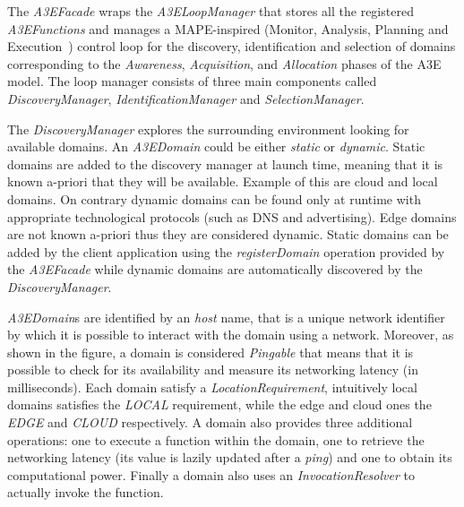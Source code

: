 The \textit{A3EFacade} wraps the \textit{A3ELoopManager} that stores all the registered \textit{A3EFunctions} and manages a MAPE-inspired (Monitor, Analysis, Planning and Execution~\cite{kephart2003vision}) control loop for the discovery, identification and selection of domains corresponding to the \textit{Awareness}, \textit{Acquisition}, and \textit{Allocation} phases of the A3E model. The loop manager  consists of three main components called \textit{DiscoveryManager}, \textit{IdentificationManager} and \textit{SelectionManager}. 

The \textit{DiscoveryManager} explores the surrounding environment looking for available domains. An  \textit{A3EDomain} could be either \textit{static} or \textit{dynamic}. Static domains are added to the discovery manager at launch time, meaning that it is known a-priori that they will be available. Example of this are cloud and local domains. On contrary dynamic domains can be found only at runtime with appropriate technological protocols (such as DNS and advertising). Edge domains are not known a-priori thus they are considered dynamic. Static domains can be added by the client application using the \textit{registerDomain} operation provided by the \textit{A3EFacade} while dynamic domains are automatically discovered by the \textit{DiscoveryManager}.

 \textit{A3EDomain}s  are identified by an \textit{host} name, that is a unique network identifier by which it is possible to interact with the domain using a network. Moreover, as shown in the figure, a domain is considered \textit{Pingable} that means that it is possible to check for its availability and measure its networking latency (in milliseconds). Each domain satisfy a \textit{LocationRequirement}, intuitively local domains satisfies the \textit{LOCAL} requirement, while the edge and cloud ones the \textit{EDGE} and \textit{CLOUD} respectively.  A domain also provides three additional operations: one to execute a function within the domain, one to retrieve the networking latency (its value is lazily updated after a \textit{ping}) and one to obtain its computational power. Finally a domain also uses an \textit{InvocationResolver} to actually invoke the function. 
 
